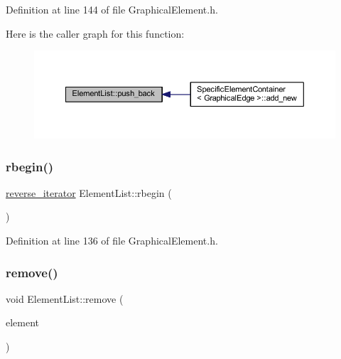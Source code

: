 Definition at line 144 of file Graphical\+Element.\+h.

Here is the caller graph for this function\+:
\nopagebreak
\begin{figure}[H]
\begin{center}
\leavevmode
\includegraphics[width=350pt]{class_element_list_a0c7327348fe7c7d8ad032ad4a71eed39_icgraph}
\end{center}
\end{figure}
\mbox{\label{class_element_list_a827726e626667715db21ad21f1b7d6fa}} 
\subsubsection{\texorpdfstring{rbegin()}{rbegin()}}
{\footnotesize\ttfamily \hyperlink{class_element_list_a5a94d1e25a0deeb3f222dc12fa115174}{reverse\+\_\+iterator} Element\+List\+::rbegin (\begin{DoxyParamCaption}{ }\end{DoxyParamCaption})\hspace{0.3cm}{\ttfamily [inline]}}



Definition at line 136 of file Graphical\+Element.\+h.

\mbox{\label{class_element_list_a06b71e09b7ca85b416effbdac076ec49}} 
\subsubsection{\texorpdfstring{remove()}{remove()}}
{\footnotesize\ttfamily void Element\+List\+::remove (\begin{DoxyParamCaption}\item[{\hyperlink{class_graphical_element}{Graphical\+Element} $\ast$}]{element }\end{DoxyParamCaption})\hspace{0.3cm}{\ttfamily [inline]}}



